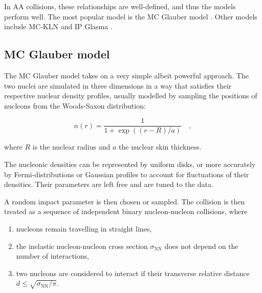 In AA collisions, these relationships are well-defined, and thus the models perform well. The most popular model is the MC Glauber model \cite{millerGlauberModelingHigh2007}. Other models include MC-KLN \cite{kharzeevHadronProductionNuclear2001} and IP Glasma \cite{schenkeFluctuatingGlasmaInitial2012}.

\subsection{MC Glauber model}

The MC Glauber model \cite{millerGlauberModelingHigh2007} takes on a very simple albeit powerful approach. The two nuclei are simulated in three dimensions in a way that satisfies their respective nuclear density profiles, usually modelled by sampling the positions of nucleons from the Woods-Saxon distribution:

\begin{minipage}{0.4\linewidth}
    \begin{center}
    \end{center}
\end{minipage}%
\begin{minipage}{0.6\linewidth}
    \begin{equation}
        n(r) = \frac{1}{1+\exp((r-R)/a)} \quad ,
    \end{equation}
\end{minipage}

where $R$ is the nuclear radius and $a$ the nuclear skin thickness.

The nucleonic densities can be represented by uniform disks, or more accurately by Fermi-distributions or Gaussian profiles to account for fluctuations of their densities. Their parameters are left free and are tuned to the data.

A random impact parameter is then chosen or sampled. The collision is then treated as a sequence of independent binary nucleon-nucleon collisions, where
\begin{enumerate}
\item nucleons remain travelling in straight lines,
\item the inelastic nucleon-nucleon cross section $\sigma_\mathrm{NN}$ does not depend on the number of interactions,
\item two nucleons are considered to interact if their transverse relative distance $d \leq \sqrt{\sigma_\mathrm{NN}/\pi}$.
\end{enumerate}

